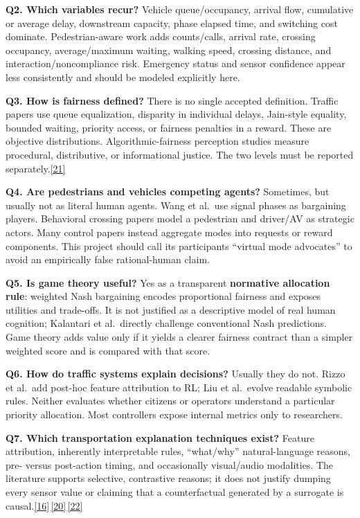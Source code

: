 \documentclass[
  english,
  11pt,
  a4paper,
]{article}
\begin{document}
\textbf{Q2. Which variables recur?} Vehicle queue/occupancy, arrival
flow, cumulative or average delay, downstream capacity, phase elapsed
time, and switching cost dominate. Pedestrian-aware work adds
counts/calls, arrival rate, crossing occupancy, average/maximum waiting,
walking speed, crossing distance, and interaction/noncompliance risk.
Emergency status and sensor confidence appear less consistently and
should be modeled explicitly here.

\textbf{Q3. How is fairness defined?} There is no single accepted
definition. Traffic papers use queue equalization, disparity in
individual delays, Jain-style equality, bounded waiting, priority
access, or fairness penalties in a reward. These are objective
distributions. Algorithmic-fairness perception studies measure
procedural, distributive, or informational justice. The two levels must
be reported separately.\hyperref[source-21]{[21]}

\textbf{Q4. Are pedestrians and vehicles competing agents?} Sometimes,
but usually not as literal human agents. Wang et al.~use signal phases
as bargaining players. Behavioral crossing papers model a pedestrian and
driver/AV as strategic actors. Many control papers instead aggregate
modes into requests or reward components. This project should call its
participants ``virtual mode advocates'' to avoid an empirically false
rational-human claim.

\textbf{Q5. Is game theory useful?} Yes as a transparent
\textbf{normative allocation rule}: weighted Nash bargaining encodes
proportional fairness and exposes utilities and trade-offs. It is not
justified as a descriptive model of real human cognition; Kalantari et
al.~directly challenge conventional Nash predictions. Game theory adds
value only if it yields a clearer fairness contract than a simpler
weighted score and is compared with that score.

\textbf{Q6. How do traffic systems explain decisions?} Usually they do
not. Rizzo et al.~add post-hoc feature attribution to RL; Liu et
al.~evolve readable symbolic rules. Neither evaluates whether citizens
or operators understand a particular priority allocation. Most
controllers expose internal metrics only to researchers.

\textbf{Q7. Which transportation explanation techniques exist?} Feature
attribution, inherently interpretable rules, ``what/why''
natural-language reasons, pre- versus post-action timing, and
occasionally visual/audio modalities. The literature supports selective,
contrastive reasons; it does not justify dumping every sensor value or
claiming that a counterfactual generated by a surrogate is
causal.\hyperref[source-16]{[16]}\,\hyperref[source-20]{[20]}\,\hyperref[source-22]{[22]}
\end{document}
